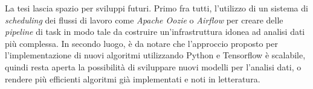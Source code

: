 \documentclass[11pt]{article}
\begin{document}
La tesi lascia spazio per sviluppi futuri. Primo fra tutti, l'utilizzo di un sistema di \textit{scheduling} dei flussi di lavoro come \emph{Apache Oozie} o \emph{Airflow} per creare delle \textit{pipeline} di task in modo tale da costruire un'infrastruttura idonea ad analisi dati più complessa. In secondo luogo, è da notare che l'approccio proposto per l'implementazione di nuovi algoritmi utilizzando Python e Tensorflow è scalabile, quindi resta aperta la possibilità di sviluppare nuovi modelli per l'analisi dati, o rendere più efficienti algoritmi già implementati e noti in letteratura.
\end{document}
